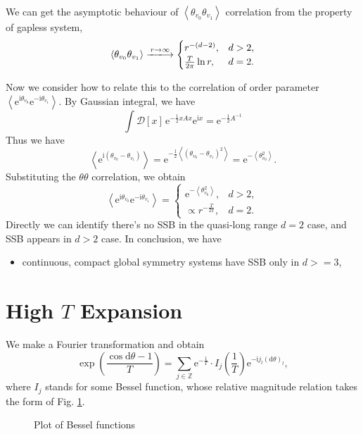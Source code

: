 We can get the asymptotic behaviour of $\left< \theta_{v_0}\theta_{v_1} \right>$ correlation from the property of gapless system,
\begin{equation}
  \left< \theta_{v_0} \theta_{v_1} \right> \xlongrightarrow{r \to \infty }
  \begin{cases}
    r^{-\left( d-2 \right)}, & d>2, \\
    \frac{T}{2\pi } \ln r, & d=2.
  \end{cases}
\end{equation}

Now we consider how to relate this to the correlation of order parameter $\left< \mathrm{e}^{\mathrm{i}\theta_{v_0}} \mathrm{e}^{-\mathrm{i} \theta_{v_1}} \right>$. By Gaussian integral, we have
\begin{equation}
  \int \mathcal{D} [x]\, \mathrm{e}^{- \frac{1}{2} x A x} \mathrm{e}^{\mathrm{i} x} = \mathrm{e}^{- \frac{1}{2} A^{-1}}
\end{equation}
Thus we have
\begin{equation}
  \left< \mathrm{e}^{\mathrm{i}\left( \theta_{v_0} - \theta_{v_1} \right)} \right> = \mathrm{e}^{- \frac{1}{2} \left< \left( \theta_{v_0} - \theta_{v_1} \right)^{2} \right>} = \mathrm{e}^{-\left< \theta_{v_0}^{2} \right>}.
\end{equation}
Substituting the $\theta\theta$ correlation, we obtain
\begin{equation}
  \left< \mathrm{e}^{\mathrm{i}\theta_{v_0}} \mathrm{e}^{-\mathrm{i}\theta_{v_1}} \right> = 
  \begin{cases}
    \mathrm{e}^{-\left< \theta_{v_0}^{2} \right>}, & d>2,
    \\
    \propto r^{- \frac{T}{2\pi }}, & d=2.
  \end{cases}
\end{equation}
Directly we can identify there's no SSB in the quasi-long range $d=2$ case, and SSB appears in $d > 2$ case.
In conclusion, we have
\begin{itemize}
  \item continuous, compact global symmetry systems have SSB only in $d>=3$,
\end{itemize}

\section{High $T$ Expansion}

We make a Fourier transformation and obtain
\begin{equation}
  \exp \left( \frac{\cos \mathrm{d} \theta - 1}{T} \right) = \sum_{j \in \mathbb{Z}} \mathrm{e}^{-\frac{1}{T}} \cdot I_{j} \left( \frac{1}{T} \right)\mathrm{e}^{- \mathrm{i} j_{l} \left( \mathrm{d} \theta \right)_{l}},
\end{equation}
where $I_{j}$ stands for some Bessel function, whose relative magnitude relation takes the form of Fig. \ref{fig:plot-of-bessel-functions}.
\begin{figure}[ht]
    \centering
    \caption{Plot of Bessel functions}
    \label{fig:plot-of-bessel-functions}
\end{figure}

